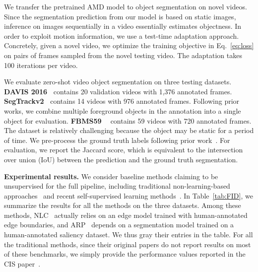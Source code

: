 We transfer the pretrained AMD model to object segmentation on novel videos.
Since the segmentation prediction from our model is based on static images, inference on images sequentially in a video essentially estimates objectness.
In order to exploit motion information, we use a test-time adaptation approach.
Concretely, given a novel video, we optimize the training objective in Eq.~\ref{eq:loss} on pairs of frames sampled from the novel testing video. The adaptation takes 100 iterations per video. 




We evaluate zero-shot video object segmentation on three testing datasets. 
{\bf DAVIS 2016~\cite{Perazzi2016}} contains 20 validation videos with 1,376 annotated frames.  
{\bf SegTrackv2~\cite{li2013video}} contains 14 videos with 976 annotated frames. Following prior works, we combine multiple foreground objects in the annotation into a single object for evaluation. 
{\bf FBMS59 ~\cite{ochs2013segmentation}} contains 59 videos with 720 annotated frames. The dataset is relatively challenging because the object may be static for a period of time. We pre-process the ground truth labels following prior work~\cite{yang2019unsupervised}.
For evaluation, we report the Jaccard score, which is equivalent to the intersection over union (IoU) between the prediction and the ground truth segmentation.

\textbf{Experimental results.} 
We consider baseline methods claiming to be unsupervised for the full pipeline, including traditional non-learning-based approaches~\cite{wang2017saliency,faktor2014video,papazoglou2013fast,keuper2015motion,koh2017primary} and recent self-supervised learning methods~\cite{yang2019unsupervised,yang2021self}.
In Table~\ref{tab:FID}, we summarize the results for all the methods on the three datasets.
Among these methods, NLC~\cite{faktor2014video} actually relies on an edge model trained with human-annotated edge boundaries, and ARP~\cite{koh2017primary} depends on a segmentation model trained on a human-annotated saliency dataset. We thus gray their entries in the table.
For all the traditional methods, since their original papers do not report results on most of these benchmarks, we simply provide the performance values reported in the CIS paper~\cite{yang2019unsupervised}.

